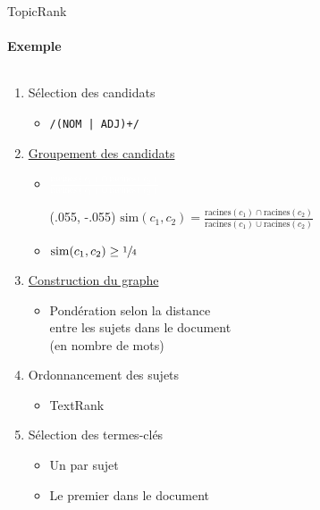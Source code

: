 \begin{frame}[label=topicrank_back]{TopicRank}\framesubtitle{Exemple}
  \begin{columns}
    \begin{column}{.45\linewidth}
      \begin{enumerate}\setlength{\itemindent}{-.75cm}
        \item<1->{Sélection des candidats}
          \begin{itemize}\setlength{\itemindent}{-1.1cm}
          \item{\texttt{/(NOM | ADJ)+/}}
        \end{itemize}
        \item<2->{\hyperlink{groupement_en_sujets}{Groupement des candidats}}
        \begin{itemize}\setlength{\itemindent}{-1.1cm}
          \item{\textcolor{white}{$\frac{\text{racines}(c_1) \cap \text{racines}(c_2)}{\text{racines}(c_1) \cup \text{racines}(c_2)}$}}
          \begin{textblock*}{\textwidth}(.055\textwidth, -.055\textheight)
            $\text{sim}(c_1, c_2) = \frac{\text{racines}(c_1) \cap \text{racines}(c_2)}{\text{racines}(c_1) \cup \text{racines}(c_2)}$
          \end{textblock*}
          \item{$\text{sim}(c_1, c_2) \geq \sfrac{1}{4}$}
        \end{itemize}
        \item<3->{\hyperlink{construction_du_graphe}{Construction du graphe}}
        \begin{itemize}\setlength{\itemindent}{-1.1cm}
          \item{
            Pondération selon la distance\\
            \hspace{-1.1cm}entre les sujets dans le document\\
            \hspace{-1.1cm}(en nombre de mots)}
        \end{itemize}
        \item<4->{Ordonnancement des sujets}
        \begin{itemize}\setlength{\itemindent}{-1.1cm}
          \item{TextRank}
        \end{itemize}
        \item<5->{Sélection des termes-clés}
        \begin{itemize}\setlength{\itemindent}{-1.1cm}
          \item{Un par sujet}
          \item{Le premier dans le document}
        \end{itemize}
      \end{enumerate}
    \end{column}


\end{columns}
\end{frame}
